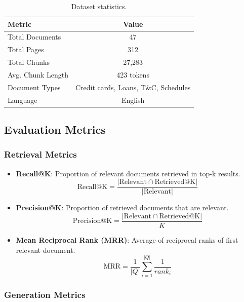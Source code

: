 \documentclass[runningheads]{llncs}
\begin{document}
\begin{table}[h]
\centering
\caption{Dataset statistics.}
\label{tab:dataset}
\begin{tabular}{lc}
\toprule
\textbf{Metric} & \textbf{Value} \\
\midrule
Total Documents & 47 \\
Total Pages & 312 \\
Total Chunks & 27,283 \\
Avg. Chunk Length & 423 tokens \\
Document Types & Credit cards, Loans, T\&C, Schedules \\
Language & English \\
\bottomrule
\end{tabular}
\end{table}

\subsection{Evaluation Metrics}

\subsubsection{Retrieval Metrics}

\begin{itemize}
    \item \textbf{Recall@K}: Proportion of relevant documents retrieved in top-k results.
    \begin{equation}
    \text{Recall@K} = \frac{|\text{Relevant} \cap \text{Retrieved@K}|}{|\text{Relevant}|}
    \end{equation}
    
    \item \textbf{Precision@K}: Proportion of retrieved documents that are relevant.
    \begin{equation}
    \text{Precision@K} = \frac{|\text{Relevant} \cap \text{Retrieved@K}|}{K}
    \end{equation}
    
    \item \textbf{Mean Reciprocal Rank (MRR)}: Average of reciprocal ranks of first relevant document.
    \begin{equation}
    \text{MRR} = \frac{1}{|Q|} \sum_{i=1}^{|Q|} \frac{1}{rank_i}
    \end{equation}
\end{itemize}

\subsubsection{Generation Metrics}
\end{document}
